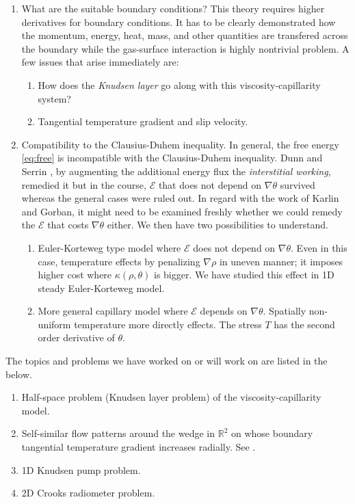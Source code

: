 \documentclass[a4paper,11pt]{article}
\def\E{\mathcal{E}}
\begin{document}
\begin{enumerate}
  \item What are the suitable boundary conditions? This theory requires higher derivatives for boundary conditions. It has to be clearly demonstrated how the momentum, energy, heat, mass, and other quantities are transfered across the boundary while the gas-surface interaction is highly nontrivial problem. A few issues that arise immediately are:
 \begin{enumerate}
  \item How does the {\it Knudsen layer} go along with this viscosity-capillarity system? %
  \item Tangential temperature gradient and slip velocity. %
 \end{enumerate}
 \item Compatibility to the Clausius-Duhem inequality. In general, the free energy \eqref{eq:free} is incompatible with the Clausius-Duhem inequality. Dunn and Serrin \cite{DS}, by augmenting the additional energy flux the {\it interstitial working}, remedied it but in the course, $\E$ that does not depend on $\nabla\theta$ survived whereas the general cases were ruled out. In regard with the work of Karlin and Gorban, it might need to be examined freshly whether we could remedy the $\E$ that costs $\nabla\theta$ either.
 We then have two possibilities to understand.
 \begin{enumerate}
  \item Euler-Korteweg type model where $\E$ does not depend on $\nabla\theta$. Even in this case, temperature effects by penalizing $\nabla\rho$ in uneven manner; it imposes higher cost where $\kappa(\rho,\theta)$ is bigger. We have studied this effect in 1D steady Euler-Korteweg model.
  \item More general capillary model where $\E$ depends on $\nabla\theta$. Spatially non-uniform temperature more directly effects. The stress $T$ has the second order derivative of $\theta$.
 \end{enumerate}
 \end{enumerate}
 
The topics and problems we have worked on or will work on are listed in the below. 
\begin{enumerate}
 \item Half-space problem (Knudsen layer problem) of the viscosity-capillarity model. %
 \item Self-similar flow patterns around the wedge in $\mathbb{R}^2$ on whose boundary tangential temperature gradient increases radially. See \cite{kim_thermal_2015}.
 \item 1D Knudsen pump problem.
 \item 2D Crooks radiometer problem.
\end{enumerate}
\end{document}
